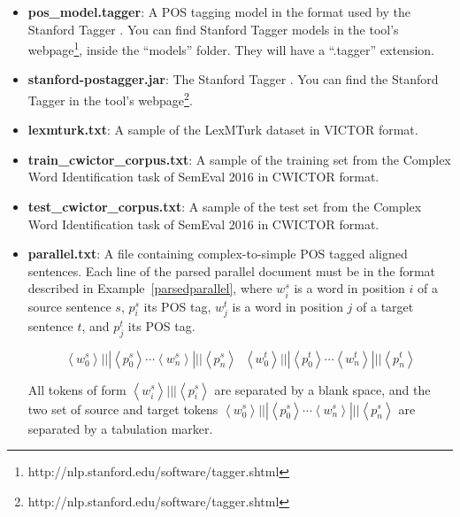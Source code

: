 \begin{itemize}
	\item \textbf{pos\_model.tagger}: A POS tagging model in the format used by the Stanford Tagger \cite{stanfordparser}. You can find Stanford Tagger models in the tool's webpage\footnote{http://nlp.stanford.edu/software/tagger.shtml}, inside the ``models'' folder. They will have a ``.tagger'' extension.
	
	\item \textbf{stanford-postagger.jar}: The Stanford Tagger \cite{stanfordparser}. You can find the Stanford Tagger in the tool's webpage\footnote{http://nlp.stanford.edu/software/tagger.shtml}.
	
	\item \textbf{lexmturk.txt}: A sample of the LexMTurk dataset \cite{Horn2014} in VICTOR format.
	
	\item \textbf{train\_cwictor\_corpus.txt}: A sample of the training set from the Complex Word Identification task of SemEval 2016 \cite{Paetzold2016SemEval} in CWICTOR format.
	
	\item \textbf{test\_cwictor\_corpus.txt}:  A sample of the test set from the Complex Word Identification task of SemEval 2016 \cite{Paetzold2016SemEval} in CWICTOR format.
	
	\item \textbf{parallel.txt}: A file containing complex-to-simple POS tagged aligned sentences. Each line of the parsed parallel document must be in the format described in Example~\ref{parsedparallel}, where $w_{i}^{s}$ is a word in position $i$ of a source sentence $s$, $p_{i}^{s}$ its POS tag, $w_{j}^{t}$ is a word in position $j$ of a target sentence $t$, and $p_{j}^{t}$ its POS tag.

\begin{equation}
\label{parsedparallel}
\left \langle w_{0}^{s} \right \rangle\! |||\! \left \langle p_{0}^{s} \right \rangle\cdots\left \langle w_{n}^{s} \right \rangle\!|||\!\left \langle p_{n}^{s} \right \rangle \;\; \left \langle w_{0}^{t} \right \rangle\! |||\! \left \langle p_{0}^{t} \right \rangle\cdots\left \langle w_{n}^{t} \right \rangle\!|||\!\left \langle p_{n}^{t} \right \rangle
\end{equation}

All tokens of form $\left \langle w_{i}^{s} \right \rangle\! |||\! \left \langle p_{i}^{s} \right \rangle$ are separated by a blank space, and the two set of source and target tokens $\left \langle w_{0}^{s} \right \rangle\! |||\! \left \langle p_{0}^{s} \right \rangle\cdots\left \langle w_{n}^{s} \right \rangle\!|||\!\left \langle p_{n}^{s} \right \rangle$ are separated by a tabulation marker.
	

\end{itemize}
